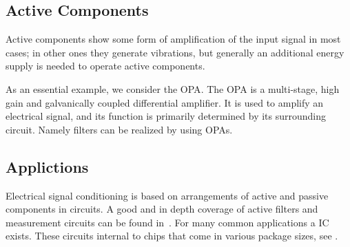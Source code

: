 




\subsection{Active Components}
Active components show some form of amplification of the input signal in most cases; in other ones they generate vibrations, but generally an additional energy supply is needed to operate active components.

As an essential example, we consider the \acf{OPA}. The \ac{OPA} is a multi-stage, high gain and galvanically coupled differential amplifier. It is used to amplify an electrical signal, and its function is primarily determined by its surrounding circuit. Namely filters can be realized by using \ac{OPA}s.

\subsection{Applictions}
Electrical signal conditioning is based on arrangements of active and passive components in circuits. A good and in depth coverage of active filters and measurement circuits can be found in~\cite{Tietze2008EC}. For many common applications a \acf{IC} exists. These circuits internal to chips that come in various package sizes, see .

